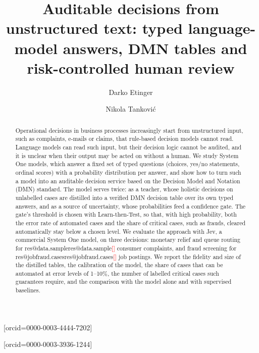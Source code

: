 \documentclass[a4paper,fleqn]{cas-sc}
\makeatletter
\theoremstyle{definition}
\newcommand{\tbd}[1]{\textcolor{red}{[\detokenize{#1}]}}
\newcommand{\res}[1]{\ifcsname res@#1\endcsname\csname res@#1\endcsname\else\tbd{#1}\fi}
\makeatother
\begin{document}
\let\WriteBookmarks\relax
\def\floatpagepagefraction{1}
\def\textpagefraction{.001}


\title[mode=title]{Auditable decisions from unstructured text: typed language-model answers, DMN tables and risk-controlled human review}

\author[1]{Darko Etinger}[orcid=0000-0003-4444-7202]
\cormark[1]

\author[1]{Nikola Tankovi\'c}[orcid=0000-0003-3936-1244]



\begin{abstract}
Operational decisions in business processes increasingly start from unstructured input, such as complaints, e-mails or claims, that rule-based decision models cannot read. Language models can read such input, but their decision logic cannot be audited, and it is unclear when their output may be acted on without a human. We study System One models, which answer a fixed set of typed questions (choices, yes/no statements, ordinal scores) with a probability distribution per answer, and show how to turn such a model into an auditable decision service based on the Decision Model and Notation (DMN) standard. The model serves twice: as a teacher, whose holistic decisions on unlabelled cases are distilled into a verified DMN decision table over its own typed answers, and as a source of uncertainty, whose probabilities feed a confidence gate. The gate's threshold is chosen with Learn-then-Test, so that, with high probability, both the error rate of automated cases and the share of critical cases, such as frauds, cleared automatically stay below a chosen level. We evaluate the approach with Jev, a commercial System One model, on three decisions: monetary relief and queue routing for \res{data.sample} consumer complaints, and fraud screening for \res{jobfraud.cases} job postings. We report the fidelity and size of the distilled tables, the calibration of the model, the share of cases that can be automated at error levels of 1--10\%, the number of labelled critical cases such guarantees require, and the comparison with the model alone and with supervised baselines.
\end{abstract}
\end{document}
